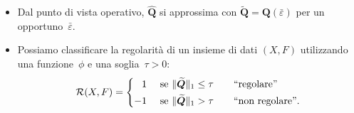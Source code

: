 \documentclass[10pt]{beamer}
\theoremstyle{definition}
\theoremstyle{plain}
\def\Cal#1{{\cal #1}}
\def\norm#1{\Vert #1\Vert}
\def\hbyw#1#2{\vbox to #1{\vfil \hbox to #2{\hfil}}}
\begin{document}
\begin{frame}

\bigskip
\begin{itemize}
\item
Dal punto di vista operativo, $\widehat{\bm Q}$ si approssima con $\widetilde{\bm Q} = \bm Q(\bar\varepsilon)$ per un opportuno~$\bar\varepsilon$.

\bigskip\medskip

\item
Possiamo classificare la regolarità di un insieme di dati $(X,F)$ utilizzando una funzione~$\phi$ e una soglia~$\tau>0$:
$$
\Cal R(X, F) = \begin{cases}
				\phantom{-}1& \text{ se $\norm{\widetilde{\bm Q}}_1 \leq \tau$\qquad “regolare”} \\
				-1& \text{ se $\norm{\hbyw{3ex}{0em}\widetilde{\bm Q}}_1 > \tau$\qquad “non regolare”}. 
			   \end{cases}
$$
\end{itemize}


\end{frame}



\end{document}
